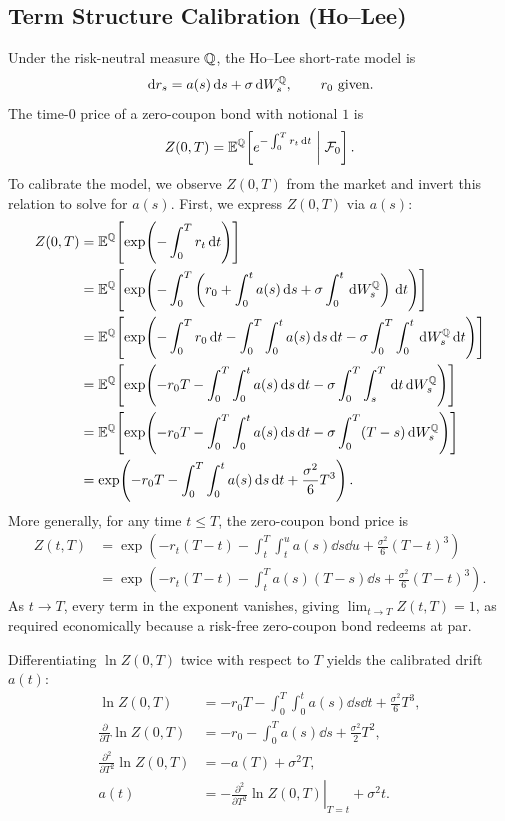 \subsection*{Term Structure Calibration (Ho--Lee)}
Under the risk-neutral measure $\mathbb{Q}$, the Ho--Lee short-rate model is
\[
\,\mathrm{d} r_s = a(s)\,\mathrm{d} s + \sigma\,\mathrm{d} W_s^{\mathbb{Q}}, \qquad r_0 \text{ given.}
\]
The time-$0$ price of a zero-coupon bond with notional $1$ is
\[
Z(0, T) = \mathbb{E}^{\mathbb{Q}}\!\left[e^{-\int_0^T r_t\,\mathrm{d} t} \;\middle|\; \mathcal{F}_0\right].
\]
To calibrate the model, we observe $Z(0, T)$ from the market and invert this relation to solve for $a(s)$. First, we express $Z(0, T)$ via $a(s)$:
\begin{align*}
Z(0, T) &= \E^{\Q}\!\left[\exp\!\left(-\int_0^T r_t\dd t\right)\right] \\
&= \E^{\Q}\!\left[\exp\!\left(-\int_0^T \left(r_0 + \int_0^t a(s)\dd s + \sigma\int_0^t \dd W_s^{\Q}\right)\dd t\right)\right] \\
&= \E^{\Q}\!\left[\exp\!\left(-\int_0^T r_0\dd t - \int_0^T \int_0^t a(s)\dd s\dd t - \sigma\int_0^T \int_0^t \dd W_s^{\Q}\dd t\right)\right] \\
&= \E^{\Q}\!\left[\exp\!\left(-r_0 T - \int_0^T \int_0^t a(s)\dd s\dd t - \sigma\int_0^T \int_s^T \dd t\dd W_s^{\Q}\right)\right] \\
&= \E^{\Q}\!\left[\exp\!\left(-r_0 T - \int_0^T \int_0^t a(s)\dd s\dd t - \sigma\int_0^T (T - s)\dd W_s^{\Q}\right)\right] \\
&= \exp\!\left(-r_0 T - \int_0^T \int_0^t a(s)\dd s\dd t + \frac{\sigma^2}{6} T^3\right).
\end{align*}
More generally, for any time $t \leq T$, the zero-coupon bond price is
\begin{align*}
Z(t, T) &= \exp\!\left(-r_t(T - t) - \int_t^T \int_t^u a(s)\dd s\dd u + \frac{\sigma^2}{6}(T - t)^3\right) \\
&= \exp\!\left(-r_t(T - t) - \int_t^T a(s)(T - s)\dd s + \frac{\sigma^2}{6}(T - t)^3\right).
\end{align*}
As $t \to T$, every term in the exponent vanishes, giving $\lim_{t \to T} Z(t, T) = 1$, as required economically because a risk-free zero-coupon bond redeems at par.

Differentiating $\ln Z(0, T)$ twice with respect to $T$ yields the calibrated drift $a(t)$:
\begin{align*}
\ln Z(0, T) &= -r_0 T - \int_0^T \int_0^t a(s)\dd s\dd t + \frac{\sigma^2}{6} T^3, \\
\frac{\partial}{\partial T}\ln Z(0, T) &= -r_0 - \int_0^T a(s)\dd s + \frac{\sigma^2}{2} T^2, \\
\frac{\partial^2}{\partial T^2}\ln Z(0, T) &= -a(T) + \sigma^2 T, \\
a(t) &= -\left.\frac{\partial^2}{\partial T^2}\ln Z(0, T)\right|_{T=t} + \sigma^2 t.
\end{align*}

